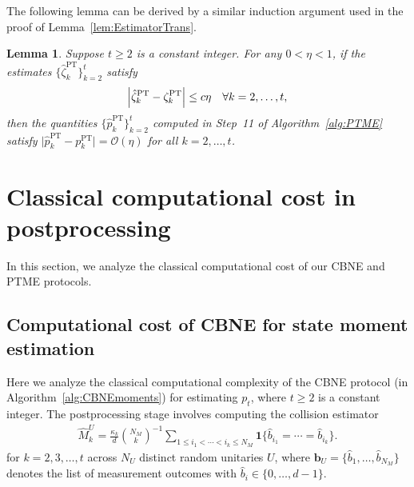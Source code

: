 \documentclass[aps,prl,twocolumn,nofootinbib,superscriptaddress,10pt]{revtex4-2}
\let\originalleft\left
\let\originalright\right
\renewcommand{\left}{\mathopen{}\mathclose\bgroup\originalleft}
\renewcommand{\right}{\aftergroup\egroup\originalright}
\theoremstyle{plain}
\newtheorem{lemma}{Lemma}
\theoremstyle{definition}
\newcommand{\PT}{\mathrm{PT}}
\newcommand{\lref}[1]{Lemma~\ref{#1}}
\begin{document}
The following lemma can be derived by a similar induction argument used in the proof of \lref{lem:EstimatorTrans}. 

\begin{lemma}\label{lem:PTMestTrans}
Suppose $t\geq 2$ is a constant integer. For any $0<\eta<1$, if the estimates $\big\{\hat{\zeta}_k^{\PT}\big\}_{k=2}^t$ satisfy
\begin{align}
\left| \hat{\zeta}_k^{\PT} - \zeta_k^{\PT}\right|  \leq c\eta \quad \forall k = 2, \dots, t, 
\end{align} 
then the quantities $\big\{\hat{p}_k^{\PT}\big\}_{k=2}^t$ computed in Step~11 of Algorithm~\ref{alg:PTME} satisfy
$\big|\hat{p}_k^{\PT} - p_k^{\PT}\big| = \mathcal{O}(\eta)$ for all $k=2,\dots,t$.
\end{lemma}



\section{Classical computational cost in postprocessing}\label{sec:computational_cost}
In this section, we analyze the classical computational cost of our CBNE and PTME protocols. 

\subsection{Computational cost of CBNE for state moment estimation} 
Here we analyze the classical computational complexity of the CBNE protocol (in Algorithm~\ref{alg:CBNEmoments}) for estimating $p_t$, where $t\geq 2$ is a constant integer. 
The postprocessing stage involves computing the collision estimator
\begin{align}\label{eq:collision_moment_SM2}
\hat M_k^U=
\frac{\kappa_k}{d}\binom{N_M}{k}^{-1}
\sum_{1\leq i_1<\cdots<i_k\leq N_M}
\mathbf{1}\{\hat{b}_{i_1}=\cdots=\hat{b}_{i_k}\}. 
\end{align}
for $k=2,3,\dots,t$ across $N_U$ distinct random unitaries $U$, 
where $\mathbf{b}_U=\{\hat{b}_1,\dots,\hat{b}_{N_M}\}$ denotes the list of measurement outcomes with $\hat{b}_i\in\{0,\dots,d-1\}$. 
\end{document}
